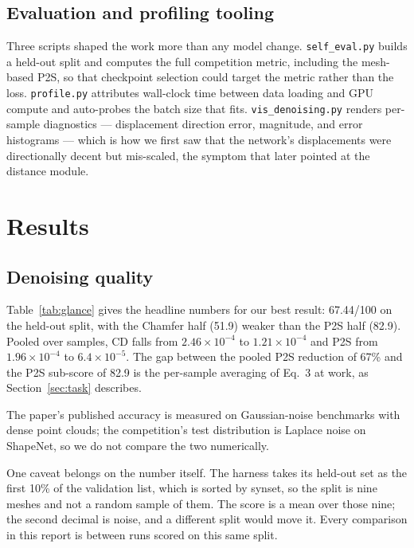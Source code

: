 \documentclass{article}
\begin{document}
\subsection{Evaluation and profiling tooling}

Three scripts shaped the work more than any model change. \texttt{self\_eval.py} builds a held-out split and computes the full competition metric, including the mesh-based P2S, so that checkpoint selection could target the metric rather than the loss. \texttt{profile.py} attributes wall-clock time between data loading and GPU compute and auto-probes the batch size that fits. \texttt{vis\_denoising.py} renders per-sample diagnostics --- displacement direction error, magnitude, and error histograms --- which is how we first saw that the network's displacements were directionally decent but mis-scaled, the symptom that later pointed at the distance module.

\section{Results}
\label{sec:results}

\subsection{Denoising quality}

Table~\ref{tab:glance} gives the headline numbers for our best result: 67.44/100 on the held-out split, with the Chamfer half (51.9) weaker than the P2S half (82.9). Pooled over samples, CD falls from $2.46\times10^{-4}$ to $1.21\times10^{-4}$ and P2S from $1.96\times10^{-4}$ to $6.4\times10^{-5}$. The gap between the pooled P2S reduction of 67\% and the P2S sub-score of 82.9 is the per-sample averaging of Eq.~3 at work, as Section~\ref{sec:task} describes.

The paper's published accuracy is measured on Gaussian-noise benchmarks with dense point clouds; the competition's test distribution is Laplace noise on ShapeNet, so we do not compare the two numerically.

One caveat belongs on the number itself. The harness takes its held-out set as the first 10\% of the validation list, which is sorted by synset, so the split is nine meshes and not a random sample of them. The score is a mean over those nine; the second decimal is noise, and a different split would move it. Every comparison in this report is between runs scored on this same split.
\end{document}
